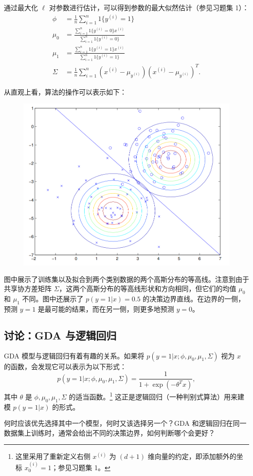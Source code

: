 通过最大化 $\ell$ 对参数进行估计，可以得到参数的最大似然估计（参见习题集 1）：
\[
\begin{aligned}
    \phi &= \frac{1}{n} \sum_{i=1}^n 1\{y^{(i)} = 1\} \\
    \mu_0 &= \frac{\sum_{i=1}^n 1\{y^{(i)} = 0\}x^{(i)}}{\sum_{i=1}^n 1\{y^{(i)} = 0\}} \\
    \mu_1 &= \frac{\sum_{i=1}^n 1\{y^{(i)} = 1\}x^{(i)}}{\sum_{i=1}^n 1\{y^{(i)} = 1\}} \\
    \Sigma &= \frac{1}{n} \sum_{i=1}^n (x^{(i)} - \mu_{y^{(i)}})(x^{(i)} - \mu_{y^{(i)}})^T.
\end{aligned}
\]

从直观上看，算法的操作可以表示如下：

\begin{figure}[H]
    \centering
    \includegraphics[width=0.5\linewidth]{figs/gda.png}
\end{figure}

图中展示了训练集以及拟合到两个类别数据的两个高斯分布的等高线。注意到由于共享协方差矩阵 $\Sigma$，这两个高斯分布的等高线形状和方向相同，但它们的均值 $\mu_0$ 和 $\mu_1$ 不同。图中还展示了 $p(y=1|x)=0.5$ 的决策边界直线。在边界的一侧，预测 $y=1$ 是最可能的结果，而在另一侧，则更多地预测 $y=0$。

\subsection{讨论：GDA 与逻辑回归}

GDA 模型与逻辑回归有着有趣的关系。如果将 $p(y=1|x; \phi, \mu_0, \mu_1, \Sigma)$ 视为 $x$ 的函数，会发现它可以表示为以下形式：
\[
    p(y=1|x; \phi, \mu_0, \mu_1, \Sigma) = \frac{1}{1+\exp(-\theta^T x)},
\]
其中 $\theta$ 是 $\phi, \mu_0, \mu_1, \Sigma$ 的适当函数。\footnote{这里采用了重新定义右侧 $x^{(i)}$ 为 $(d+1)$ 维向量的约定，即添加额外的坐标 $x_0^{(i)} = 1$；参见习题集 1。} 这正是逻辑回归（一种判别式算法）用来建模 $p(y=1|x)$ 的形式。

何时应该优先选择其中一个模型，何时又该选择另一个？GDA 和逻辑回归在同一数据集上训练时，通常会给出不同的决策边界，如何判断哪个会更好？

